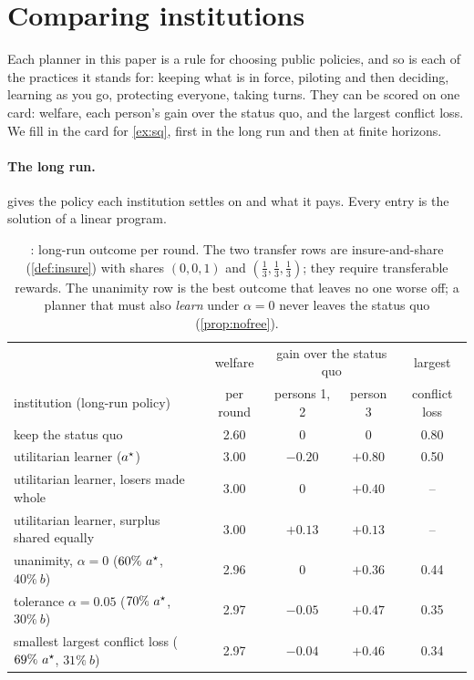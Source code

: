 \section{Comparing institutions}\label{sec:score}

Each planner in this paper is a rule for choosing public policies, and so is each of the practices it stands for: keeping what is in force, piloting and then deciding, learning as you go, protecting everyone, taking turns. They can be scored on one card: welfare, each person's gain over the status quo, and the largest conflict loss. We fill in the card for \cref{ex:sq}, first in the long run and then at finite horizons.

\paragraph{The long run.}  gives the policy each institution settles on and what it pays. Every entry is the solution of a linear program.

\begin{table}[h]\centering\small
\begin{tabular}{lcccc}
\toprule
& welfare & \multicolumn{2}{c}{gain over the status quo} & largest\\
institution (long-run policy) & per round & persons 1, 2 & person 3 & conflict loss\\
\midrule
keep the status quo & 2.60 & $0$ & $0$ & 0.80\\
utilitarian learner ($a^\star$) & 3.00 & $-0.20$ & $+0.80$ & 0.50\\
utilitarian learner, losers made whole & 3.00 & $0$ & $+0.40$ & --\\
utilitarian learner, surplus shared equally & 3.00 & $+0.13$ & $+0.13$ & --\\
unanimity, $\alpha=0$ ($60\%\ a^\star$, $40\%\ b$) & 2.96 & $0$ & $+0.36$ & 0.44\\
tolerance $\alpha=0.05$ ($70\%\ a^\star$, $30\%\ b$) & 2.97 & $-0.05$ & $+0.47$ & 0.35\\
smallest largest conflict loss ($69\%\ a^\star$, $31\%\ b$) & 2.97 & $-0.04$ & $+0.46$ & 0.34\\
\bottomrule
\end{tabular}
\caption{: long-run outcome per round. The two transfer rows are insure-and-share (\cref{def:insure}) with shares $(0,0,1)$ and $(\tfrac13,\tfrac13,\tfrac13)$; they require transferable rewards. The unanimity row is the best outcome that leaves no one worse off; a planner that must also \emph{learn} under $\alpha=0$ never leaves the status quo (\cref{prop:nofree}).}
\label{tab:score}
\end{table}

